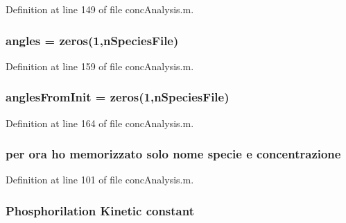 Definition at line 149 of file conc\-Analysis.\-m.

\hypertarget{a00019_aee6c8457aab4cc643bbdaea8794ca74e}{
\subsubsection[{angles}]{\setlength{\rightskip}{0pt plus 5cm}angles = zeros(1,n\-Species\-File)}}\label{a00019_aee6c8457aab4cc643bbdaea8794ca74e}


Definition at line 159 of file conc\-Analysis.\-m.

\hypertarget{a00019_a860d662b73220f44f28099dfa9d3de76}{
\subsubsection[{angles\-From\-Init}]{\setlength{\rightskip}{0pt plus 5cm}angles\-From\-Init = zeros(1,n\-Species\-File)}}\label{a00019_a860d662b73220f44f28099dfa9d3de76}


Definition at line 164 of file conc\-Analysis.\-m.

\hypertarget{a00019_a5acf1fa9f8d0cb2ab8b1505ffd4dce5b}{
\subsubsection[{concentrazione}]{ per ora ho memorizzato solo nome specie e concentrazione}}\label{a00019_a5acf1fa9f8d0cb2ab8b1505ffd4dce5b}


Definition at line 101 of file conc\-Analysis.\-m.

\hypertarget{a00019_a163bb0e728c363ddfbd84725ee4bcbf1}{
\subsubsection[{constant}]{\setlength{\rightskip}{0pt plus 5cm}Phosphorilation Kinetic constant}}\label{a00019_a163bb0e728c363ddfbd84725ee4bcbf1}


